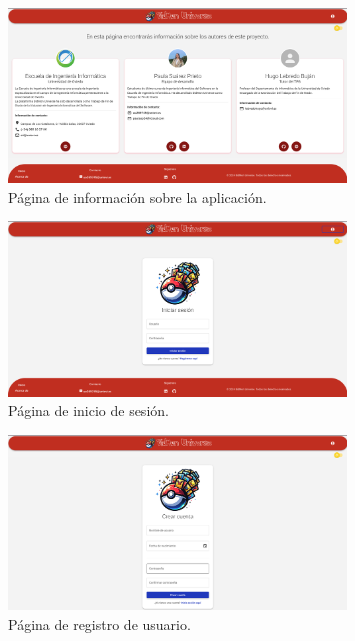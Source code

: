 \begin{figure}[H]
    \centering
    \includegraphics[width=0.8\textwidth]{figures/6-Analisis/6-Interfaz/interfaz/about.png}
    \caption{Página de información sobre la aplicación.}
    \label{fig:interfaz-about}
\end{figure}

\begin{figure}[H]
    \centering
    \includegraphics[width=0.8\textwidth]{figures/6-Analisis/6-Interfaz/interfaz/login.png}
    \caption{Página de inicio de sesión.}
    \label{fig:interfaz-login}
\end{figure}

\begin{figure}[H]
    \centering
    \includegraphics[width=0.8\textwidth]{figures/6-Analisis/6-Interfaz/interfaz/signup.png}
    \caption{Página de registro de usuario.}
    \label{fig:interfaz-registro}
\end{figure}

